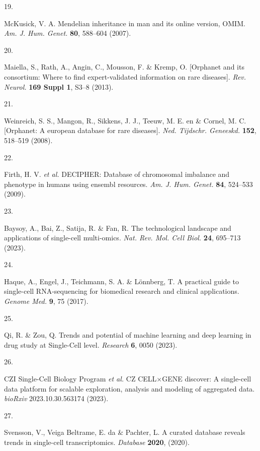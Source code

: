 \documentclass[
]{report}
\newlength{\cslhangindent}
\newlength{\csllabelwidth}
\newenvironment{CSLReferences}[2] %
 {\begin{list}{}{%
  \setlength{\itemindent}{0pt}
  \setlength{\leftmargin}{0pt}
  \setlength{\parsep}{0pt}
  \ifodd #1
   \setlength{\leftmargin}{\cslhangindent}
   \setlength{\itemindent}{-1\cslhangindent}
  \fi
  \setlength{\itemsep}{#2\baselineskip}}}
 {\end{list}}
\newcommand{\CSLLeftMargin}[1]{\parbox[t]{\csllabelwidth}{\strut#1\strut}}
\newcommand{\CSLRightInline}[1]{\parbox[t]{\linewidth - \csllabelwidth}{\strut#1\strut}}
\begin{document}
\begin{CSLReferences}{0}{0}
\CSLLeftMargin{19. }%
\CSLRightInline{McKusick, V. A. Mendelian inheritance in man and its
online version, {OMIM}. \emph{Am. J. Hum. Genet.} \textbf{80}, 588--604
(2007).}

\CSLLeftMargin{20. }%
\CSLRightInline{Maiella, S., Rath, A., Angin, C., Mousson, F. \& Kremp,
O. {[}Orphanet and its consortium: Where to find expert-validated
information on rare diseases{]}. \emph{Rev. Neurol.} \textbf{169 Suppl
1}, S3--8 (2013).}

\CSLLeftMargin{21. }%
\CSLRightInline{Weinreich, S. S., Mangon, R., Sikkens, J. J., Teeuw, M.
E. en \& Cornel, M. C. {[}Orphanet: A european database for rare
diseases{]}. \emph{Ned. Tijdschr. Geneeskd.} \textbf{152}, 518--519
(2008).}

\CSLLeftMargin{22. }%
\CSLRightInline{Firth, H. V. \emph{et al.} {DECIPHER}: Database of
chromosomal imbalance and phenotype in humans using ensembl resources.
\emph{Am. J. Hum. Genet.} \textbf{84}, 524--533 (2009).}

\CSLLeftMargin{23. }%
\CSLRightInline{Baysoy, A., Bai, Z., Satija, R. \& Fan, R. The
technological landscape and applications of single-cell multi-omics.
\emph{Nat. Rev. Mol. Cell Biol.} \textbf{24}, 695--713 (2023).}

\CSLLeftMargin{24. }%
\CSLRightInline{Haque, A., Engel, J., Teichmann, S. A. \& Lönnberg, T. A
practical guide to single-cell {RNA-sequencing} for biomedical research
and clinical applications. \emph{Genome Med.} \textbf{9}, 75 (2017).}

\CSLLeftMargin{25. }%
\CSLRightInline{Qi, R. \& Zou, Q. Trends and potential of machine
learning and deep learning in drug study at {Single-Cell} level.
\emph{Research} \textbf{6}, 0050 (2023).}

\CSLLeftMargin{26. }%
\CSLRightInline{CZI Single-Cell Biology Program \emph{et al.} {CZ}
{CELL\(\times\)GENE} discover: A single-cell data platform for scalable
exploration, analysis and modeling of aggregated data. \emph{bioRxiv}
2023.10.30.563174 (2023).}

\CSLLeftMargin{27. }%
\CSLRightInline{Svensson, V., Veiga Beltrame, E. da \& Pachter, L. A
curated database reveals trends in single-cell transcriptomics.
\emph{Database} \textbf{2020}, (2020).}


\end{CSLReferences}
\end{document}
